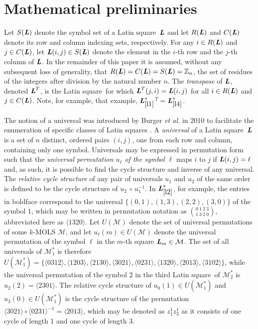 \documentclass[11pt, a4paper]{article}
\newcommand{\lat}{Latin square}
\renewcommand{\l}{ \mbox{\bf \emph{L}} }
\newcommand{\m}{\mathcal{ M}}
\newcommand{\lref}[1]{$\l_{\ref{#1}}^*$}
\newcounter{ls}
\begin{document}
\section{Mathematical preliminaries}

Let $S(\l)$ denote the symbol set of a \lat \ $\l$ and let $R(\l)$ and $C(\l)$ denote its row and column indexing sets, respectively.   For any $i \in R(\l)$ and $j \in C(\l)$, let $\l(i,j) \in S(\l)$   denote the element in the $i$-th row and the $j$-th column of $\l$. In the remainder of this paper it is assumed, without any subsequent loss of generality, that  $R(\l)= C(\l)=S(\l) = \mathbb{Z}_n$, the set of residues of the integers after division by the natural number $n$. The \emph{transpose} of $\l$, denoted $\l^T$, is the \lat \ for which $\l^T(j,i) = \l(i,j)$ for all $i\in R(\l)$ and $j\in C(\l)$. Note, for example, that example, \lref{l1}$^T =$\lref{l4}.%

The notion of a universal was introduced by Burger \emph{et al.} \cite{burger2010} in 2010 to facilitate the enumeration of specific classes of \lat s . A \emph{universal}  of a \lat \ $\l$ is a set of $n$ distinct, ordered pairs $(i,j)$, one from each row and column, containing only one symbol. Universals may be expressed in permutation form such that the \emph{universal permutation $u_{\ell}$ of the symbol $\ell$} maps $ i $ to $j $ if $\l(i,j) = \ell$ and, as such, it is possible to find the cycle structure and inverse of any universal. The \emph{relative cycle structure} of any pair of universals $u_1$ and $u_2$ of the same order is defined to be the cycle structure of $u_2\, \circ \, u_1^{-1}$. 
In \lref{l2}, for example,  the entries in boldface correspond to the universal $\{(0,1), (1,3), (2, 2), (3, 0)\}$ of the symbol $1$, which may be written in permutation notation as $\binom{0\ 1\ 2\ 3}{1\ 3\ 2\ 0}$, abbreviated here as $\langle1320\rangle$. Let $U(\m)$ denote the set of universal permutations of some $k$-MOLS $\m$, and let $u_{\ell}(m)\in U(\m)$ denote the universal permutation of the symbol $\ell$ in the $m$-th square $\l_m \in \m$. The set of all universals of $\m_1^*$ is therefore $U(\m_1^*) = \{\langle 0312 \rangle, \langle 1203 \rangle, \langle 2130 \rangle, \langle 3021 \rangle,\langle 0231 \rangle,\langle 1320 \rangle, \langle 2013 \rangle, \langle 3102 \rangle \}$, while the universal permutation of the symbol 2 in the third \lat \ of $\m_2^*$ is $u_2{(2)} = \langle 2301 \rangle$. The relative cycle structure of $u_0(1)\in U(\m_1^*)$ and $u_3(0) \in U(\m_1^*)$ is the cycle structure of the permutation $ \langle 3021 \rangle \circ \langle 0231 \rangle^{-1} = \langle 2013 \rangle$, which may be denoted as $z_1^1z_3^1$ as it consists of one cycle of length 1 and one cycle of length 3.
\end{document}
